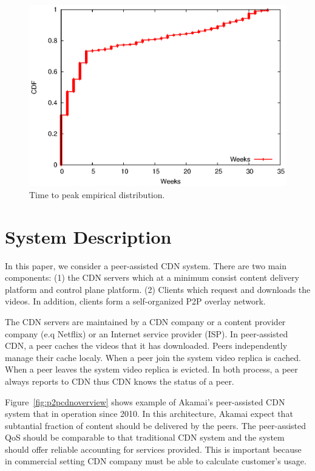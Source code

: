 \documentclass[conference]{IEEEtran}
\begin{document}
\begin{figure}[!th]
\begin{center}
\includegraphics[scale=0.6]{graphs/timetopeak.eps}
\end{center}
\caption{Time to peak empirical distribution.}
\label{fig:timetopeak}
\vspace{-2mm}
\end{figure} 



\section{System Description}\label{systemdescription}
In this paper, we consider a peer-assisted CDN system. 
There are two main components: (1) the CDN servers which at a minimum consist content delivery platform and control plane platform. 
(2) Clients which request and downloads the videos.
In addition, clients form a self-organized P2P overlay network.

The CDN servers are maintained by a CDN company or a content provider company (e.q Netflix) or an Internet service provider (ISP).
In peer-assisted CDN, a peer caches the videos that it has downloaded.
Peers independently manage their cache localy.
When a peer join the system video replica is cached.
When a peer leaves the system video replica is evicted. 
In both process, a peer always reports to CDN thus CDN knows the status of a peer.

Figure~\ref{fig:p2pcdnoverview} shows example of Akamai's peer-assisted CDN system that in operation since 2010.
In this architecture, Akamai expect that subtantial fraction of content should be delivered by the peers. 
The peer-assisted QoS should be comparable to that traditional CDN system and the system should offer reliable accounting for services provided. 
This is important because in commercial setting CDN company must be able to calculate customer's usage.
\end{document}
